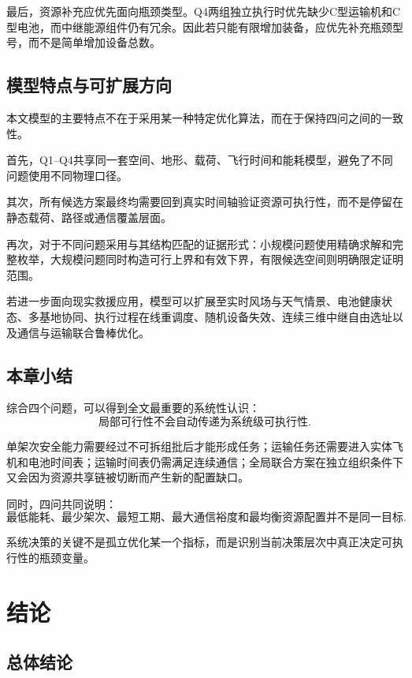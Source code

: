 \documentclass[UTF8,a4paper,12pt]{ctexart}
\begin{document}
最后，资源补充应优先面向瓶颈类型。Q4两组独立执行时优先缺少C型运输机和C型电池，而中继能源组件仍有冗余。因此若只能有限增加装备，应优先补充瓶颈型号，而不是简单增加设备总数。

\subsection{模型特点与可扩展方向}

本文模型的主要特点不在于采用某一种特定优化算法，而在于保持四问之间的一致性。

首先，Q1--Q4共享同一套空间、地形、载荷、飞行时间和能耗模型，避免了不同问题使用不同物理口径。

其次，所有候选方案最终均需要回到真实时间轴验证资源可执行性，而不是停留在静态载荷、路径或通信覆盖层面。

再次，对于不同问题采用与其结构匹配的证据形式：小规模问题使用精确求解和完整枚举，大规模问题同时构造可行上界和有效下界，有限候选空间则明确限定证明范围。

若进一步面向现实救援应用，模型可以扩展至实时风场与天气情景、电池健康状态、多基地协同、执行过程在线重调度、随机设备失效、连续三维中继自由选址以及通信与运输联合鲁棒优化。

\subsection{本章小结}

综合四个问题，可以得到全文最重要的系统性认识：
\[
\boxed{
\text{局部可行性不会自动传递为系统级可执行性}
}.
\]

单架次安全能力需要经过不可拆组批后才能形成任务；运输任务还需要进入实体飞机和电池时间表；运输时间表仍需满足连续通信；全局联合方案在独立组织条件下又会因为资源共享链被切断而产生新的配置缺口。

同时，四问共同说明：
\[
\boxed{
\text{最低能耗、最少架次、最短工期、最大通信裕度和最均衡资源配置并不是同一目标}
}.
\]

系统决策的关键不是孤立优化某一个指标，而是识别当前决策层次中真正决定可执行性的瓶颈变量。

\section{结论}
\label{sec:conclusion}

\subsection{总体结论}
\end{document}
